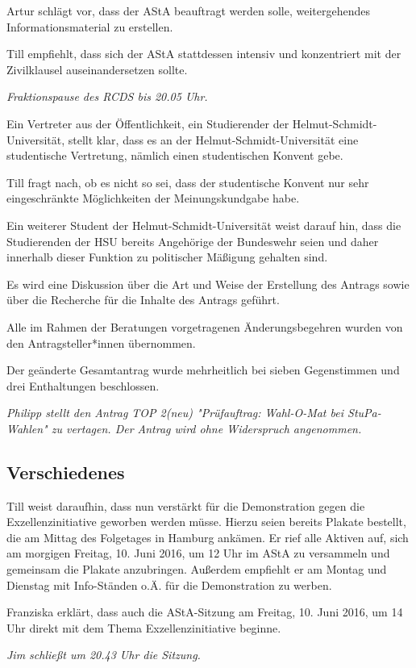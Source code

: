 \documentclass[ngerman,headheight=70pt]{scrartcl}
\begin{document}
    Artur schlägt vor, dass der AStA beauftragt werden solle, weitergehendes
    Informationsmaterial zu erstellen.

    Till empfiehlt, dass sich der AStA stattdessen intensiv und konzentriert mit
    der Zivilklausel auseinandersetzen sollte.

    \textit{Fraktionspause des RCDS bis 20.05 Uhr.}

    Ein Vertreter aus der Öffentlichkeit, ein Studierender der
    Helmut-Schmidt-Universität, stellt klar, dass es an der Helmut-Schmidt-Universität
    eine studentische Vertretung, nämlich einen studentischen Konvent gebe.

    Till fragt nach, ob es nicht so sei, dass der studentische Konvent nur sehr
    eingeschränkte Möglichkeiten der Meinungskundgabe habe.

    Ein weiterer Student der Helmut-Schmidt-Universität weist darauf hin, dass
    die Studierenden der HSU bereits Angehörige der Bundeswehr seien und daher
    innerhalb dieser Funktion zu politischer Mäßigung gehalten sind.

    Es wird eine Diskussion über die Art und Weise der Erstellung des Antrags
    sowie über die Recherche für die Inhalte des Antrags geführt.

    Alle im Rahmen der Beratungen vorgetragenen Änderungsbegehren wurden von den
    Antragsteller*innen übernommen.

    Der geänderte Gesamtantrag wurde mehrheitlich bei sieben Gegenstimmen und
    drei Enthaltungen beschlossen.

    \textit{Philipp stellt den Antrag TOP 2(neu) "Prüfauftrag: Wahl-O-Mat bei
    StuPa-Wahlen" zu vertagen. Der Antrag wird ohne Widerspruch angenommen.}

    \subsection{Verschiedenes}

    Till weist daraufhin, dass nun verstärkt für die Demonstration gegen die
    Exzellenzinitiative geworben werden müsse. Hierzu seien bereits Plakate bestellt,
    die am Mittag des Folgetages in Hamburg ankämen. Er rief alle Aktiven auf,
    sich am morgigen Freitag, 10. Juni 2016, um 12 Uhr im AStA zu versammeln und
    gemeinsam die Plakate anzubringen. Außerdem empfiehlt er am Montag und
    Dienstag mit Info-Ständen o.Ä. für die Demonstration zu werben.

    Franziska erklärt, dass auch die AStA-Sitzung am Freitag, 10. Juni 2016, um
    14 Uhr direkt mit dem Thema Exzellenzinitiative beginne.

    \textit{Jim schließt um 20.43 Uhr die Sitzung.}
\end{document}
